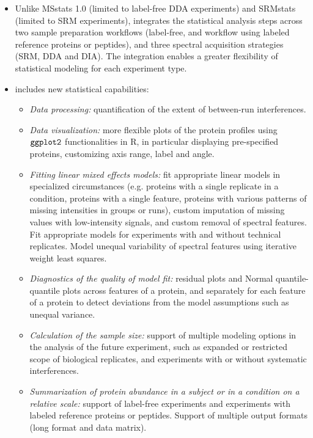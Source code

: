 \documentclass[11pt]{article}
\begin{document}
\begin{itemize}
\item Unlike MSstats 1.0 (limited to label-free DDA experiments) and SRMstats (limited to SRM experiments),   integrates the statistical analysis steps across two sample preparation workflows (label-free, and workflow using labeled reference proteins or peptides), and three spectral acquisition strategies (SRM, DDA and DIA). The integration enables a greater flexibility of statistical modeling for each experiment type.

\item \m includes new statistical capabilities:
\begin{itemize}
\item {\it Data processing:} quantification of the extent of between-run interferences.

\item {\it Data visualization:} more flexible plots of the protein profiles using $\tt{ggplot2}$ functionalities in R, in particular displaying pre-specified proteins, customizing axis range, label and angle.

\item {\it Fitting linear mixed effects models:} fit appropriate linear models in specialized circumstances (e.g. proteins with a single replicate in a condition, proteins with a single feature, proteins with various patterns of missing intensities in groups or runs), custom imputation of missing values with low-intensity signals, and custom removal of spectral features. Fit appropriate models for experiments with and without technical replicates. Model unequal variability of spectral features using iterative weight least squares.

\item {\it Diagnostics of the quality of model fit:} residual plots and Normal quantile-quantile plots across features of a protein, and separately for each feature of a protein to detect deviations from the model assumptions such as unequal variance.

\item {\it Calculation of the sample size:} support of multiple modeling options in the analysis of the future experiment, such as expanded or restricted scope of biological replicates, and experiments with or without systematic interferences.
  
\item {\it Summarization of protein abundance in a subject or in a condition on a relative scale:} support of label-free experiments and experiments with labeled reference proteins or peptides. Support of multiple output formats (long format and data matrix).


\end{itemize}
\end{itemize}
\end{document}
